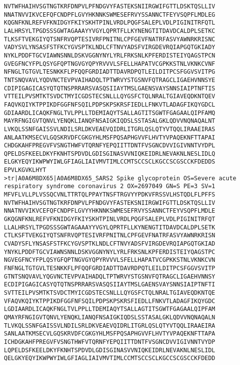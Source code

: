 \documentclass[en,black,12pt,normal]{elegantnote}
\begin{document}
\begin{lstlisting}
NVTWFHAIHVSGTNGTKRFDNPVLPFNDGVYFASTEKSNIIRGWIFGTTLDSKTQSLLIV
NNATNVVIKVCEFQFCNDPFLGVYHKNNKSWMESEFRVYSSANNCTFEYVSQPFLMDLEG
KQGNFKNLREFVFKNIDGYFKIYSKHTPINLVRDLPQGFSALEPLVDLPIGINITRFQTL
LALHRSYLTPGDSSSGWTAGAAAYYVGYLQPRTFLLKYNENGTITDAVDCALDPLSETKC
TLKSFTVEKGIYQTSNFRVQPTESIVRFPNITNLCPFGEVFNATRFASVYAWNRKRISNC
VADYSVLYNSASFSTFKCYGVSPTKLNDLCFTNVYADSFVIRGDEVRQIAPGQTGKIADY
NYKLPDDFTGCVIAWNSNNLDSKVGGNYNYLYRLFRKSNLKPFERDISTEIYQAGSTPCN
GVEGFNCYFPLQSYGFQPTNGVGYQPYRVVVLSFELLHAPATVCGPKKSTNLVKNKCVNF
NFNGLTGTGVLTESNKKFLPFQQFGRDIADTTDAVRDPQTLEILDITPCSFGGVSVITPG
TNTSNQVAVLYQDVNCTEVPVAIHADQLTPTWRVYSTGSNVFQTRAGCLIGAEHVNNSYE
CDIPIGAGICASYQTQTNSPRRARSVASQSIIAYTMSLGAENSVAYSNNSIAIPTNFTIS
VTTEILPVSMTKTSVDCTMYICGDSTECSNLLLQYGSFCTQLNRALTGIAVEQDKNTQEV
FAQVKQIYKTPPIKDFGGFNFSQILPDPSKPSKRSFIEDLLFNKVTLADAGFIKQYGDCL
GDIAARDLICAQKFNGLTVLPPLLTDEMIAQYTSALLAGTITSGWTFGAGAALQIPFAMQ
MAYRFNGIGVTQNVLYENQKLIANQFNSAIGKIQDSLSSTASALGKLQDVVNQNAQALNT
LVKQLSSNFGAISSVLNDILSRLDKVEAEVQIDRLITGRLQSLQTYVTQQLIRAAEIRAS
ANLAATKMSECVLGQSKRVDFCGKGYHLMSFPQSAPHGVVFLHVTYVPAQEKNFTTAPAI
CHDGKAHFPREGVFVSNGTHWFVTQRNFYEPQIITTDNTFVSGNCDVVIGIVNNTVYDPL
QPELDSFKEELDKYFKNHTSPDVDLGDISGINASVVNIQKEIDRLNEVAKNLNESLIDLQ
ELGKYEQYIKWPWYIWLGFIAGLIAIVMVTIMLCCMTSCCSCLKGCCSCGSCCKFDEDDS
EPVLKGVKLHYT
>tr|A0A6M8DX65|A0A6M8DX65_SARS2 Spike glycoprotein OS=Severe acute respiratory syndrome coronavirus 2 OX=2697049 GN=S PE=3 SV=1
MFVFLVLLPLVSSQCVNLTTRTQLPPAYTNSFTRGVYYPDKVFRSSVLHSTQDLFLPFFS
NVTWFHAIHVSGTNGTKRFDNPVLPFNDGVYFASTEKSNIIRGWIFGTTLDSKTQSLLIV
NNATNVVIKVCEFQFCNDPFLGVYYHKNNKSWMESEFRVYSSANNCTFEYVSQPFLMDLE
GKQGNFKNLREFVFKNIDGYFKIYSKHTPINLVRDLPQGFSALEPLVDLPIGINITRFQT
LLALHRSYLTPGDSSSGWTAGAAAYYVGYLQPRTFLLKYNENGTITDAVDCALDPLSETK
CTLKSFTVEKGIYQTSNFRVQPTESIVRFPNITNLCPFGEVFNATRFASVYAWNRKRISN
CVADYSFLYNSASFSTFKCYGVSPTKLNDLCFTNVYADSFVIRGDEVRQIAPGQTGKIAD
YNYKLPDDFTGCVIAWNSNNLDSKVGGNYNYLYRLFRKSNLKPFERDISTEIYQAGSTPC
NGVEGFNCYFPLQSYGFQPTNGVGYQPYRVVVLSFELLHAPATVCGPKKSTNLVKNKCVN
FNFNGLTGTGVLTESNKKFLPFQQFGRDIADTTDAVRDPQTLEILDITPCSFGGVSVITP
GTNTSNQVAVLYQGVNCTEVPVAIHADQLTPTWRVYSTGSNVFQTRAGCLIGAEHVNNSY
ECDIPIGAGICASYQTQTNSPRRARSVASQSIIAYTMSLGAENSVAYSNNSIAIPTNFTI
SVTTEILPVSMTKTSVDCTMYICGDSTECSNLLLQYGSFCTQLNRALTGIAVEQDKNTQE
VFAQVKQIYKTPPIKDFGGFNFSQILPDPSKPSKRSFIEDLLFNKVTLADAGFIKQYGDC
LGDIAARDLICAQKFNGLTVLPPLLTDEMIAQYTSALLAGTITSGWTFGAGAALQIPFAM
QMAYRFNGIGVTQNVLYENQKLIANQFNSAIGKIQDSLSSTASALGKLQDVVNQNAQALN
TLVKQLSSNFGAISSVLNDILSRLDKVEAEVQIDRLITGRLQSLQTYVTQQLIRAAEIRA
SANLAATKMSECVLGQSKRVDFCGKGYHLMSFPQSAPHGVVFLHVTYVPAQEKNFTTAPA
ICHDGKAHFPREGVFVSNGTHWFVTQRNFYEPQIITTDNTFVSGNCDVVIGIVNNTVYDP
LQPELDSFKEELDKYFKNHTSPDVDLGDISGINASVVNIQKEIDRLNEVAKNLNESLIDL
QELGKYEQYIKWPWYIWLGFIAGLIAIVMVTIMLCCMTSCCSCLKGCCSCGSCCKFDEDD

\end{lstlisting}
\end{document}
